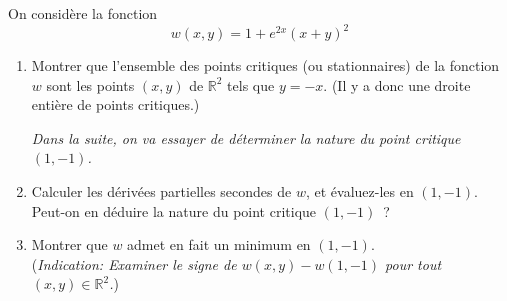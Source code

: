 \begin{exo}
  On considère la fonction
    \begin{equation}
      w(x,y) = 1 + e^{2x}(x+y)^{2} \label{sol_2}
    \end{equation}
  \begin{enumerate}
    \item Montrer que l'ensemble des points critiques (ou stationnaires) de la fonction $w$ sont les points $(x,y)$ de $\mathbb{R}^{2}$ tels que $y=-x$. (Il y a donc une droite entière de points critiques.)

    {\em Dans la suite, on va essayer de déterminer la nature du point critique $(1,-1)$.}

    \item Calculer les dérivées partielles secondes de $w$, et évaluez-les en $(1,-1)$. Peut-on en déduire la nature du point critique $(1,-1)$~?

    \item Montrer que $w$ admet en fait un minimum en $(1,-1)$.\\
    ({\em Indication: Examiner le signe de $w(x,y) - w(1,-1)$ pour tout $(x,y) \in \mathbb{R}^{2}$.})
  \end{enumerate}
\end{exo}

